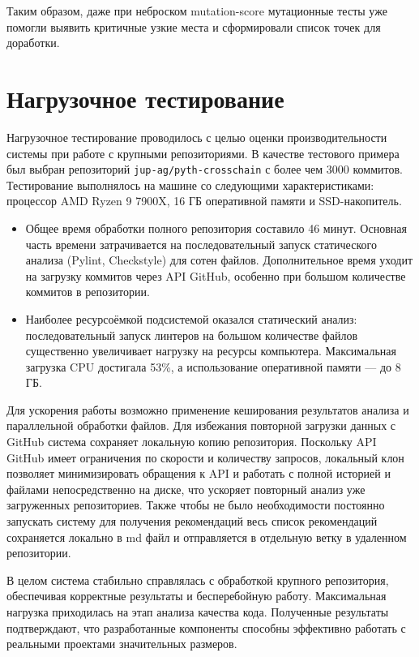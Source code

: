 Таким образом, даже при неброском mutation-score
мутационные тесты уже помогли выявить критичные узкие места
и сформировали список точек для доработки.
	

\section{Нагрузочное тестирование}

Нагрузочное тестирование проводилось с целью оценки производительности системы при работе с крупными репозиториями. В качестве тестового примера был выбран репозиторий \texttt{jup-ag/pyth-crosschain} с более чем 3000 коммитов. Тестирование выполнялось на машине со следующими характеристиками: процессор AMD Ryzen 9 7900X, 16 ГБ оперативной памяти и SSD-накопитель.

\begin{itemize}
	\item Общее время обработки полного репозитория составило 46 минут. Основная часть времени затрачивается на последовательный запуск статического анализа (Pylint, Checkstyle) для сотен файлов. Дополнительное время уходит на загрузку коммитов через API GitHub, особенно при большом количестве коммитов в репозитории.
	
	\item Наиболее ресурсоёмкой подсистемой оказался статический анализ: последовательный запуск линтеров на большом количестве файлов существенно увеличивает нагрузку на ресурсы компьютера. Максимальная загрузка CPU достигала 53\%, а использование оперативной памяти — до 8 ГБ.
\end{itemize}
Для ускорения работы возможно применение кеширования результатов анализа и параллельной обработки файлов. Для избежания повторной загрузки данных с GitHub система сохраняет локальную копию репозитория. Поскольку API GitHub имеет ограничения по скорости и количеству запросов, локальный клон позволяет минимизировать обращения к API и работать с полной историей и файлами непосредственно на диске, что ускоряет повторный анализ уже загруженных репозиториев. Также чтобы не было необходимости постоянно запускать систему для получения рекомендаций весь список рекомендаций сохраняется локально в md файл и отправляется в отдельную ветку в удаленном репозитории.


В целом система стабильно справлялась с обработкой крупного репозитория, обеспечивая корректные результаты и бесперебойную работу. Максимальная нагрузка приходилась на этап анализа качества кода. Полученные результаты подтверждают, что разработанные компоненты способны эффективно работать с реальными проектами значительных размеров.

